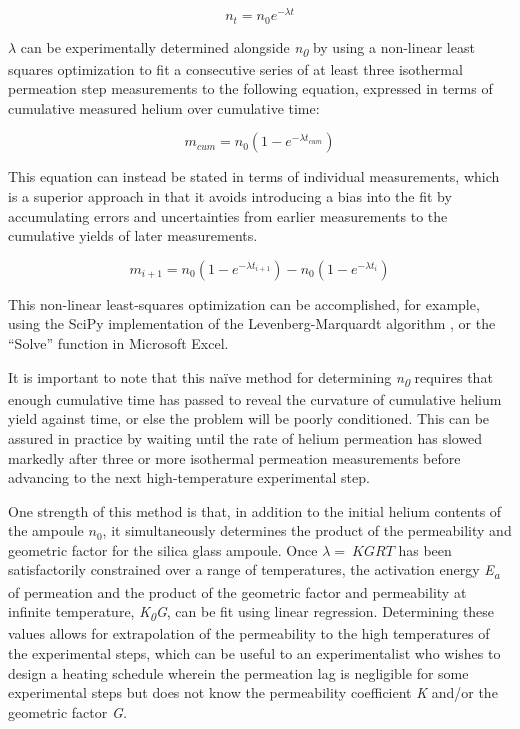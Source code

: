 \begin{equation}
\label{eq:naive}
n_{t} = n_{0}e^{- \lambda t}
\end{equation}

\(\lambda\) can be experimentally determined alongside \emph{n\textsubscript{0}} by using a non-linear least squares optimization to fit a consecutive series of at least three isothermal permeation step measurements to the following equation, expressed in terms of cumulative measured helium over cumulative time:

\begin{equation}
\label{eq:cumyield}
m_{cum} = n_{0}\left( 1 - e^{- \lambda t_{cum}} \right)
\end{equation}

This equation can instead be stated in terms of individual measurements, which is a superior approach in that it avoids introducing a bias into the fit by accumulating errors and uncertainties from earlier measurements to the cumulative yields of later measurements.

\begin{equation}
\label{eq:incyield}
m_{i + 1} = n_{0}\left( 1 - e^{- \lambda t_{i + 1}} \right) - n_{0}\left( 1 - e^{- \lambda t_{i}} \right)
\end{equation}

This non-linear least-squares optimization can be accomplished, for example, using the SciPy implementation of the Levenberg-Marquardt algorithm \citep{virtanen2020}, or the ``Solve'' function in Microsoft Excel.

It is important to note that this naïve method for determining \emph{n\textsubscript{0}} requires that enough cumulative time has passed to reveal the curvature of cumulative helium yield against time, or else the problem will be poorly conditioned. This can be assured in practice by waiting until the rate of helium permeation has slowed markedly after three or more isothermal permeation measurements before advancing to the next high-temperature experimental step.

One strength of this method is that, in addition to the initial helium contents of the ampoule \(n_{0}\), it simultaneously determines the product of the permeability and geometric factor for the silica glass ampoule. Once \(\lambda = \ KGRT\) has been satisfactorily constrained over a range of temperatures, the activation energy \emph{E\textsubscript{a}} of permeation and the product of the geometric factor and permeability at infinite temperature, \emph{K\textsubscript{0}G}, can be fit using linear regression. Determining these values allows for extrapolation of the permeability to the high temperatures of the experimental steps, which can be useful to an experimentalist who wishes to design a heating schedule wherein the permeation lag is negligible for some experimental steps but does not know the permeability coefficient \emph{K} and/or the geometric factor \emph{G.}

